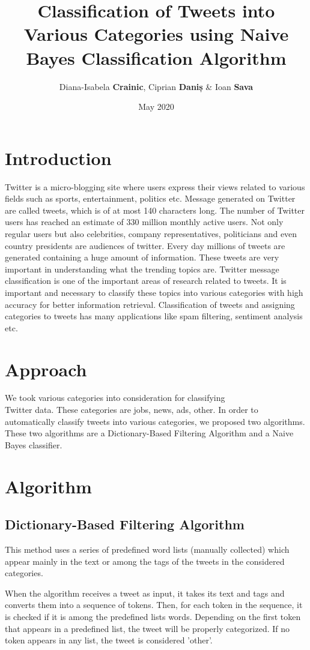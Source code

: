 \documentclass{article}
\title{Classification of Tweets into Various Categories using Naive Bayes Classification Algorithm}
\author{Diana-Isabela \textbf{Crainic}, Ciprian \textbf{Daniș} \& Ioan \textbf{Sava}}
\date{May 2020}
\begin{document}
\maketitle

\section{Introduction}
\large
{
\quad
Twitter is a micro-blogging site where users express their
views related to various fields such as sports, entertainment,
politics etc. Message generated on Twitter are called tweets,
which is of at most 140 characters long. The number of
Twitter users has reached an estimate of 330 million monthly
active users. Not only regular users but also celebrities,
company representatives, politicians and even country
presidents are audiences of twitter. Every day millions of
tweets are generated containing a huge amount of
information. These tweets are very important in
understanding what the trending topics are. Twitter message
classification is one of the important areas of research
related to tweets. It is important and necessary to classify
these topics into various categories with high accuracy for
better information retrieval. Classification of tweets and
assigning categories to tweets has many applications like
spam filtering, sentiment analysis etc.\cite{introduction}
}


\section{Approach}
\large
{
\quad
We took various categories into consideration for classifying 
\\Twitter data.
These categories are jobs, news, ads, other.
In order to automatically classify tweets into various categories, we proposed two algorithms. These two algorithms are a Dictionary-Based Filtering Algorithm and a Naive Bayes classifier.
}

\section{Algorithm}


\subsection{Dictionary-Based Filtering Algorithm}
\large
{
\quad
This method uses a series of predefined word lists (manually collected) which appear mainly in the text or among the tags of the tweets in the considered categories.

\quad
When the algorithm receives a tweet as input, it takes its text and tags and converts them into a sequence of tokens. Then, for each token in the sequence, it is checked if it is among the predefined lists words. Depending on the first token that appears in a predefined list, the tweet will be properly categorized. If no token appears in any list, the tweet is considered 'other'.
}
\end{document}
